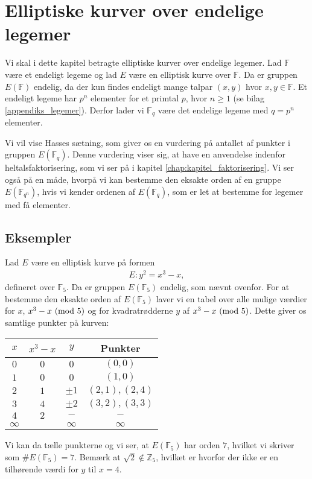 \chapter{Elliptiske kurver over endelige legemer}

Vi skal i dette kapitel betragte elliptiske kurver over endelige legemer. Lad $\mathbb{F}$ være et endeligt legeme og lad $E$ være en elliptisk kurve over $\mathbb{F}$. Da er gruppen $E(\mathbb{F})$ endelig, da der kun findes endeligt mange talpar $(x, y)$ hvor $x, y \in \mathbb{F}$. Et endeligt legeme har $p^n$ elementer for et primtal $p$, hvor $n \geq 1$ (se bilag \ref{appendiks_legemer}). Derfor lader vi $\mathbb{F}_{q}$ være det endelige legeme med $q = p^n$ elementer. 

Vi vil vise Hasses sætning, som giver os en vurdering på antallet af punkter i gruppen $E(\mathbb{F}_q)$. Denne vurdering viser sig, at have en anvendelse indenfor heltalsfaktorisering, som vi ser på i kapitel \ref{chap:kapitel_faktorisering}. Vi ser også på en måde, hvorpå vi kan bestemme den eksakte orden af en gruppe $E(\mathbb{F}_{q^n})$, hvis vi kender ordenen af $E(\mathbb{F}_q)$, som er let at bestemme for legemer med få elementer.


\section{Eksempler}
\label{endelige_legemer:eksempler}
Lad $E$ være en elliptisk kurve på formen
\begin{align*}
	E : y^2 = x^3 - x,
\end{align*}
defineret over $\mathbb{F}_5$. Da er gruppen $E(\mathbb{F}_5)$ endelig, som nævnt ovenfor. For at bestemme den eksakte orden af $E(\mathbb{F}_5)$ laver vi en tabel over alle mulige værdier for $x$, $x^3-x \ (\mathrm{mod} \ 5)$ og for kvadratrødderne $y$ af $x^3 - x \ (\mathrm{mod} \ 5)$. Dette giver os samtlige punkter på kurven:
\begin{center}
\begin{tabular}{c c c c }
$x$ & $x^3 - x$ & $y$ & Punkter \\ 
\hline
$0$ & $0$ & $0$ & $(0, 0)$ \\ 
$1$ & $0$ & $0$ & $(1, 0)$ \\ 
$2$ & $1$ & $\pm 1$ & $(2, 1), (2, 4)$ \\ 
$3$ & $4$ & $\pm 2$ & $(3, 2), (3, 3)$ \\ 
$4$ & $2$ & $-$ & $-$ \\ 
$\infty$ & & $\infty$ & $\infty$ \\
\end{tabular} 
\end{center}
Vi kan da tælle punkterne og vi ser, at $E(\mathbb{F}_5)$ har orden $7$, hvilket vi skriver som 
$\#E(\mathbb{F}_5) = 7$. Bemærk at $\sqrt{2} \notin \mathbb{Z}_5$, hvilket er hvorfor der ikke er en tilhørende værdi for $y$ til $x=4$.

